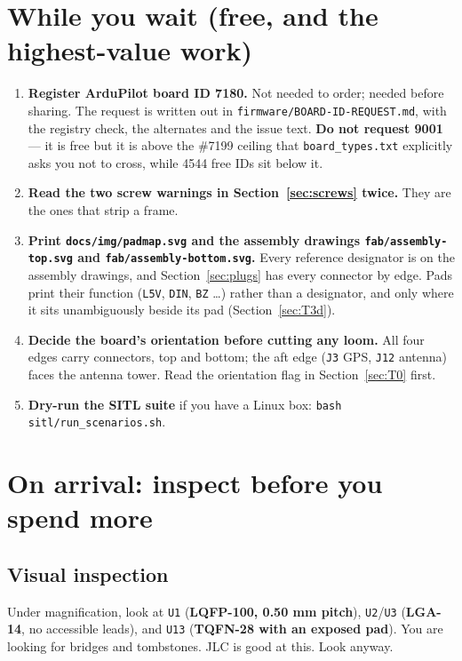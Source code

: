 \documentclass[11pt,a4paper]{article}
\newcommand{\file}[1]{\texttt{\small #1}}
\newcommand{\cmd}[1]{\texttt{\small #1}}
\newcommand{\flag}[1]{\textcolor{warnred}{\textbf{#1}}}
\begin{document}
\section{While you wait (free, and the highest-value work)}

\begin{enumerate}
\item \textbf{Register ArduPilot board ID 7180.} Not needed to order; needed before
sharing. The request is written out in \file{firmware/BOARD-ID-REQUEST.md}, with the
registry check, the alternates and the issue text. \flag{Do not request 9001} --- it is
free but it is above the \#7199 ceiling that \file{board\_types.txt} explicitly asks you
not to cross, while 4544 free IDs sit below it.
\item \textbf{Read the two screw warnings in Section~\ref{sec:screws} twice.} They are the
ones that strip a frame.
\item \textbf{Print \file{docs/img/padmap.svg} and the assembly drawings
\file{fab/assembly-top.svg} and \file{fab/assembly-bottom.svg}.} Every reference designator
is on the assembly drawings, and Section~\ref{sec:plugs} has every connector by edge. Pads
print their function (\file{L5V}, \file{DIN}, \file{BZ} \dots) rather than a designator,
and only where it sits unambiguously beside its pad (Section~\ref{sec:T3d}).
\item \textbf{Decide the board's orientation before cutting any loom.} All four edges carry
connectors, top and bottom; the aft edge (\file{J3} GPS, \file{J12} antenna) faces the
antenna tower. Read the orientation flag in Section~\ref{sec:T0} first.
\item \textbf{Dry-run the SITL suite} if you have a Linux box:
\cmd{bash sitl/run\_scenarios.sh}.
\end{enumerate}

\section{On arrival: inspect before you spend more}

\subsection{Visual inspection}

Under magnification, look at \file{U1} (\textbf{LQFP-100, 0.50 mm pitch}),
\file{U2}/\file{U3} (\textbf{LGA-14}, no accessible leads), and \file{U13}
(\textbf{TQFN-28 with an exposed pad}). You are looking for bridges and tombstones.
JLC is good at this. Look anyway.
\end{document}
